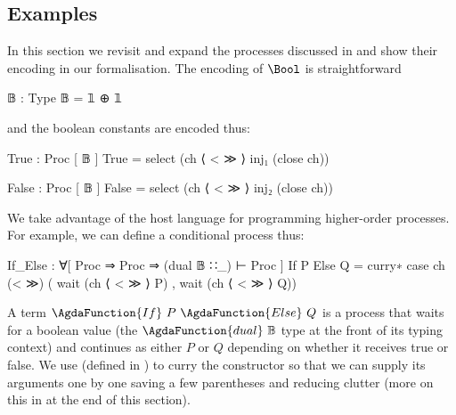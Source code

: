 \subsection{Examples}
\label{sec:examples}


In this section we revisit and expand the processes discussed in
 and show their encoding in our formalisation. The
encoding of $\Bool$ is straightforward

\begin{code}
𝔹 : Type
𝔹 = 𝟙 ⊕ 𝟙
\end{code}
and the boolean constants are encoded thus:
\begin{code}
True : Proc [ 𝔹 ]
True = select (ch ⟨ < ≫ ⟩ inj₁ (close ch))

False : Proc [ 𝔹 ]
False = select (ch ⟨ < ≫ ⟩ inj₂ (close ch))
\end{code}

We take advantage of the host language for programming higher-order processes.
For example, we can define a conditional process thus:

\begin{code}
If_Else : ∀[ Proc ⇒ Proc ⇒ (dual 𝔹 ∷_) ⊢ Proc ]
If P Else Q = curry∗ case ch (< ≫) (  wait (ch ⟨ < ≫ ⟩ P)
                                   ,  wait (ch ⟨ < ≫ ⟩ Q))
\end{code}

A term $~P~~Q$ is a process that waits for a
boolean value (\cf the $~$ type at the front of its
typing context) and continues as either $P$ or $Q$ depending on whether it
receives true or false. We use  (defined in
) to curry the constructor
 so that we can supply its arguments one by one
saving a few parentheses and reducing clutter (more on this in 
at the end of this section).

